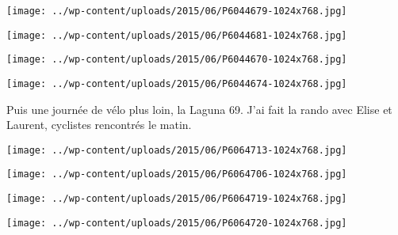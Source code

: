  

 

\begin{center} \texttt{[image: ../wp-content/uploads/2015/06/P6044679-1024x768.jpg]} \end{center}

 

 

\begin{center} \texttt{[image: ../wp-content/uploads/2015/06/P6044681-1024x768.jpg]} \end{center}

 

 

\begin{center} \texttt{[image: ../wp-content/uploads/2015/06/P6044670-1024x768.jpg]} \end{center}

 

 

\begin{center} \texttt{[image: ../wp-content/uploads/2015/06/P6044674-1024x768.jpg]} \end{center}

 

 Puis une journée de vélo plus loin, la Laguna 69. J'ai fait la rando avec Elise et Laurent, cyclistes rencontrés le matin. 

 

\begin{center} \texttt{[image: ../wp-content/uploads/2015/06/P6064713-1024x768.jpg]} \end{center}

 

 

\begin{center} \texttt{[image: ../wp-content/uploads/2015/06/P6064706-1024x768.jpg]} \end{center}

 

 

\begin{center} \texttt{[image: ../wp-content/uploads/2015/06/P6064719-1024x768.jpg]} \end{center}

 

 

\begin{center} \texttt{[image: ../wp-content/uploads/2015/06/P6064720-1024x768.jpg]} \end{center}

